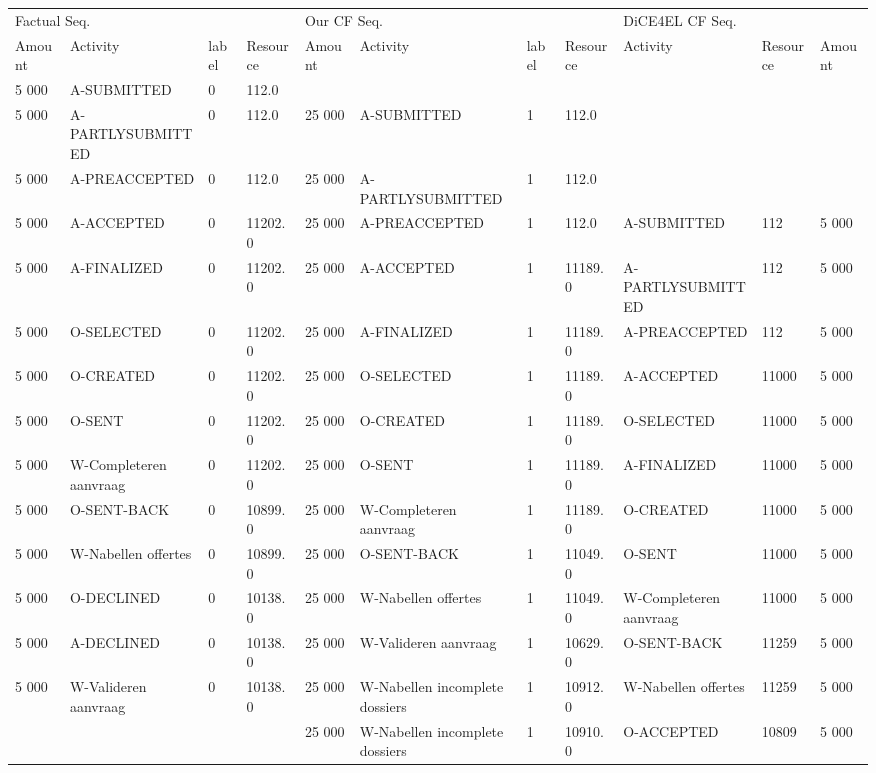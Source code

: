 \begin{tabular}{lllllllllll}
\toprule
\multicolumn{4}{l}{Factual Seq.} & \multicolumn{4}{l}{Our CF Seq.} & \multicolumn{3}{l}{DiCE4EL CF Seq.} \\
Amount & Activity & label & Resource & Amount & Activity & label & Resource & Activity & Resource & Amount \\
\midrule
5 000 & A-SUBMITTED & 0 & 112.0 &  &  &  &  &  &  &  \\
5 000 & A-PARTLYSUBMITTED & 0 & 112.0 & 25 000 & A-SUBMITTED & 1 & 112.0 &  &  &  \\
5 000 & A-PREACCEPTED & 0 & 112.0 & 25 000 & A-PARTLYSUBMITTED & 1 & 112.0 &  &  &  \\
5 000 & A-ACCEPTED & 0 & 11202.0 & 25 000 & A-PREACCEPTED & 1 & 112.0 & A-SUBMITTED & 112 & 5 000 \\
5 000 & A-FINALIZED & 0 & 11202.0 & 25 000 & A-ACCEPTED & 1 & 11189.0 & A-PARTLYSUBMITTED & 112 & 5 000 \\
5 000 & O-SELECTED & 0 & 11202.0 & 25 000 & A-FINALIZED & 1 & 11189.0 & A-PREACCEPTED & 112 & 5 000 \\
5 000 & O-CREATED & 0 & 11202.0 & 25 000 & O-SELECTED & 1 & 11189.0 & A-ACCEPTED & 11000 & 5 000 \\
5 000 & O-SENT & 0 & 11202.0 & 25 000 & O-CREATED & 1 & 11189.0 & O-SELECTED & 11000 & 5 000 \\
5 000 & W-Completeren aanvraag & 0 & 11202.0 & 25 000 & O-SENT & 1 & 11189.0 & A-FINALIZED & 11000 & 5 000 \\
5 000 & O-SENT-BACK & 0 & 10899.0 & 25 000 & W-Completeren aanvraag & 1 & 11189.0 & O-CREATED & 11000 & 5 000 \\
5 000 & W-Nabellen offertes & 0 & 10899.0 & 25 000 & O-SENT-BACK & 1 & 11049.0 & O-SENT & 11000 & 5 000 \\
5 000 & O-DECLINED & 0 & 10138.0 & 25 000 & W-Nabellen offertes & 1 & 11049.0 & W-Completeren aanvraag & 11000 & 5 000 \\
5 000 & A-DECLINED & 0 & 10138.0 & 25 000 & W-Valideren aanvraag & 1 & 10629.0 & O-SENT-BACK & 11259 & 5 000 \\
5 000 & W-Valideren aanvraag & 0 & 10138.0 & 25 000 & W-Nabellen incomplete dossiers & 1 & 10912.0 & W-Nabellen offertes & 11259 & 5 000 \\
 &  &  &  & 25 000 & W-Nabellen incomplete dossiers & 1 & 10910.0 & O-ACCEPTED & 10809 & 5 000 \\
\bottomrule
\end{tabular}
